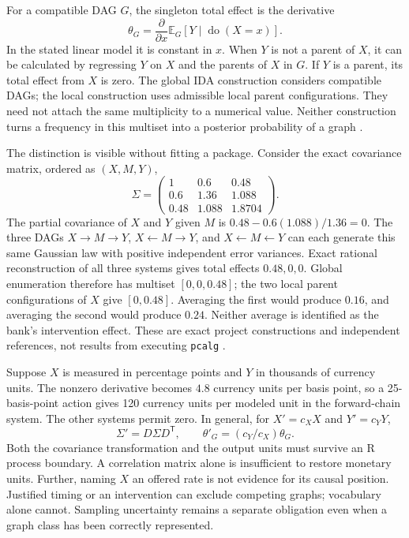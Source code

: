 For a compatible DAG \(G\), the singleton total effect is the derivative
\[
 \theta_G=\frac{\partial}{\partial x}
     \mathbb E_G[Y\mid\operatorname{do}(X=x)].
\] In the stated linear model it is constant in \(x\). When \(Y\) is not
a parent of \(X\), it can be calculated by regressing \(Y\) on \(X\) and
the parents of \(X\) in \(G\). If \(Y\) is a parent, its total effect
from \(X\) is zero. The global IDA construction considers compatible
DAGs; the local construction uses admissible local parent
configurations. They need not attach the same multiplicity to a
numerical value. Neither construction turns a frequency in this multiset
into a posterior probability of a graph
\citep{exec13_pcalg,exec13_pcalg_reuse_primary}.

The distinction is visible without fitting a package. Consider the exact
covariance matrix, ordered as \((X,M,Y)\), \[
 \Sigma=\begin{pmatrix}
  1&0.6&0.48\\
  0.6&1.36&1.088\\
  0.48&1.088&1.8704
 \end{pmatrix}.
\] The partial covariance of \(X\) and \(Y\) given \(M\) is
\(0.48-0.6(1.088)/1.36=0\). The three DAGs \(X\to M\to Y\),
\(X\leftarrow M\to Y\), and \(X\leftarrow M\leftarrow Y\) can each
generate this same Gaussian law with positive independent error
variances. Exact rational reconstruction of all three systems gives
total effects \(0.48,0,0\). Global enumeration therefore has multiset
\([0,0,0.48]\); the two local parent configurations of \(X\) give
\([0,0.48]\). Averaging the first would produce \(0.16\), and averaging
the second would produce \(0.24\). Neither average is identified as the
bank's intervention effect. These are exact project constructions and
independent references, not results from executing \texttt{pcalg}
\citep{exec13_pcalg_reuse_examples}.

Suppose \(X\) is measured in percentage points and \(Y\) in thousands of
currency units. The nonzero derivative becomes \(4.8\) currency units
per basis point, so a 25-basis-point action gives 120 currency units per
modeled unit in the forward-chain system. The other systems permit zero.
In general, for \(X'=c_X X\) and \(Y'=c_Y Y\), \[
 \Sigma'=D\Sigma D^{\mathsf T},\qquad
 \theta'_G=(c_Y/c_X)\theta_G.
\] Both the covariance transformation and the output units must survive
an R process boundary. A correlation matrix alone is insufficient to
restore monetary units. Further, naming \(X\) an offered rate is not
evidence for its causal position. Justified timing or an intervention
can exclude competing graphs; vocabulary alone cannot. Sampling
uncertainty remains a separate obligation even when a graph class has
been correctly represented.

